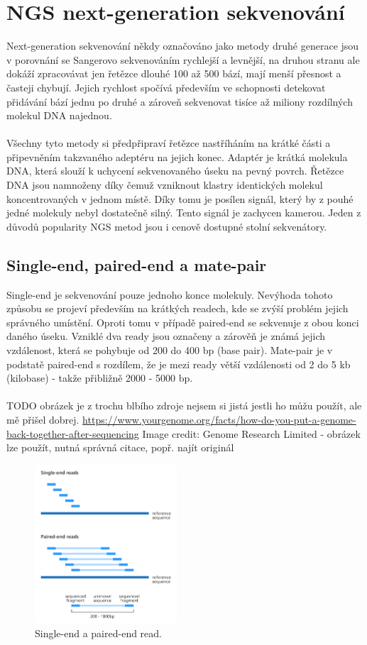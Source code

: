 \documentclass[czech,DP]{thesiskiv}
\numberwithin{equation}{section}
\begin{document}
\section{NGS next-generation sekvenování}
Next-generation sekvenování někdy označováno jako metody druhé generace jsou v porovnání se Sangerovo sekvenováním rychlejší a levnější, na druhou stranu ale dokáží zpracovávat jen řetězce dlouhé 100 až 500 bází, mají menší přesnost a časteji chybují. Jejich rychlost spočívá především ve schopnosti detekovat přidávání bází jednu po druhé a zároveň sekvenovat tisíce až miliony rozdílných molekul DNA najednou. 
\\
\\
Všechny tyto metody si předpřipraví řetězce nastříháním na krátké části a připevněním takzvaného adeptéru na jejich konec. Adaptér je krátká molekula DNA, která slouží k uchycení sekvenovaného úseku na pevný povrch. Řetězce DNA jsou namnoženy díky čemuž vzniknout klastry identických molekul koncentrovaných v jednom místě. Díky tomu je posílen signál, který by z pouhé jedné molekuly nebyl dostatečně silný. Tento signál je zachycen kamerou. Jeden z důvodů popularity NGS metod jsou i cenově dostupné stolní sekvenátory.
 
\subsection{Single-end, paired-end a mate-pair}
Single-end je sekvenování pouze jednoho konce molekuly. Nevýhoda tohoto způsobu se projeví především na krátkých readech, kde se zvýší problém jejich správného umístění. Oproti tomu v případě paired-end se sekvenuje z obou konci daného úseku. Vzniklé dva ready jsou označeny a zárověň je známá jejich vzdálenost, která se pohybuje od 200 do 400 bp (base pair). Mate-pair je v podstatě paired-end s rozdílem, že je mezi ready větší vzdálenosti od 2 do 5 kb (kilobase) - takže přibližně 2000 - 5000 bp. \cite{illumina}  
\\
\\
TODO obrázek je z trochu blbího zdroje nejsem si jistá jestli ho můžu použít, ale mě přišel dobrej. \url{https://www.yourgenome.org/facts/how-do-you-put-a-genome-back-together-after-sequencing}
Image credit: Genome Research Limited - obrázek lze použít, nutná správná citace, popř. najít originál

\begin{figure}[H]		
		\centering
		\includegraphics[width=200px]{./img/single_end_pair_end_reads_yourgenome.png}
		\caption{Single-end a paired-end read.}
		\label{fig:single_end_paired_end}
\end{figure} 
 
\end{document}

